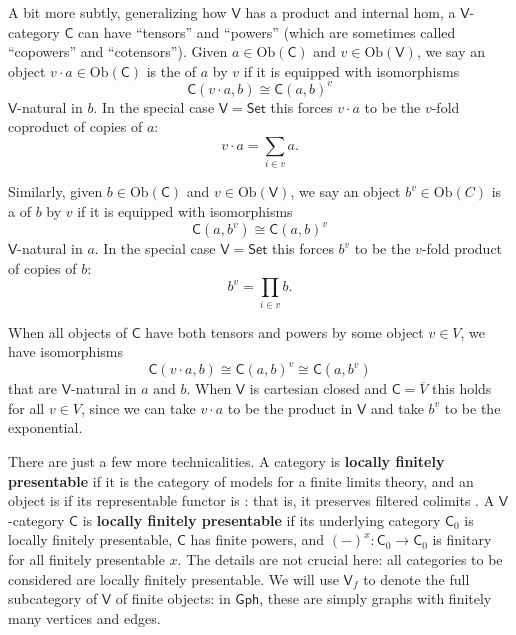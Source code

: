 \documentclass{amsart}
\newcommand{\define}[1]{{\bf \boldmath{#1}}}
\theoremstyle{definition}
\newcommand{\Gph}{\mathsf{Gph}}
\newcommand{\Set}{\mathsf{Set}}
\newcommand{\V}{\mathsf{V}}
\newcommand{\C}{\mathsf{C}}
\newcommand{\op}{\mathrm{op}}
\newcommand{\Obj}{\mathrm{Ob}}
\newcommand{\maps}{\colon}
\begin{document}
A bit more subtly, generalizing how $\V$ has a product and internal hom, a $\V$-category $\C$ can
have ``tensors'' and ``powers'' (which are sometimes called ``copowers'' and ``cotensors'').
Given $a \in \Obj(\C)$ and $v \in \Obj(\V)$, we say an object $v \cdot a \in \Obj(\C)$ is the \define{tensor} of $a$ by $v$ if it is equipped with isomorphisms
\[
	\C(v\cdot a,b) \cong  \C(a,b)^v
\]
$\V$-natural in $b$.
In the special case $\V = \Set$ this forces $v \cdot a$ to be the $v$-fold coproduct 
of copies of $a$:
\[       v \cdot a = \sum_{i \in v} a . \]
\iffalse
In general, if we can choose a tensor product $v \cdot a$ for all $v \in \V$, $a \in \C$
we say $\C$ is \textbf{$\V$-tensored}, and we obtain a $\V$-functor
\[
\begin{array}{ccl}
  \underline{\V} \times \C  &\to& \C \\
 (v,a) &\mapsto & v \cdot a. \\
\end{array}
\]
For example, $\underline{\V}$ is always $\V$-tensored via the cartesian product
$ \times \maps \underline{\V} \times \underline{\V} \to \underline{\V} $.
\fi
Similarly, given $b \in \Obj(\C)$ and $v \in \Obj(\V)$, we say an object $b^v \in \Obj(C)$ is a \define{power} of $b$ by $v$ if it is equipped with isomorphisms
\[
		 \C(a,b^v) \cong \C(a,b)^v
\]
$\V$-natural in $a$.  
In the special case $\V = \Set$  this forces $b^v$ to be the $v$-fold product of copies of $b$:
\[          b^v = \prod_{i \in v} b . \]
\iffalse
In general, if we can choose a power $b^v$ for all $b \in C$, $v \in \V$,
we say $\C$ is \textbf{$\V$-powered}, and we obtain a $\V$-functor
\[
\begin{array}{ccl}
 \C \times \underline{\V}^\op  &\to& \C \\
 (b, v) &\mapsto & b^v .\\
\end{array}
\]
\fi
When all objects of $\C$ have both tensors and powers by some object $v \in V$, we have isomorphisms
\[
	\C(v\cdot a,b) \cong \C(a,b)^v \cong \C(a, b^v)
\]
that are $\V$-natural in $a$ and $b$.  When $\V$ is cartesian closed and $\C = \overline{V}$
this holds for all $v \in V$, since we can take $v \cdot a$ to be the product in $\V$ and take
$b^v$ to be the exponential.


There are just a few more technicalities. A category is \textbf{locally finitely presentable} if it is the category of models for a finite limits theory, and an object is \define{finite} if its representable functor is \define{finitary}: that is, it preserves filtered colimits \cite{adamekrosicky}.   A $\V$-category $\C$ is \textbf{locally finitely presentable} if its underlying category $\C_0$ is locally finitely presentable, $\C$ has finite powers, and $(-)^x\maps \C_0 \to \C_0$ is finitary for all finitely presentable $x$.  The details are not crucial here: all categories to be considered are locally finitely presentable. We will use  $\V_f$ to denote the full subcategory of $\V$ of finite objects: in $\Gph$, these are simply graphs with finitely many vertices and edges.
\end{document}
